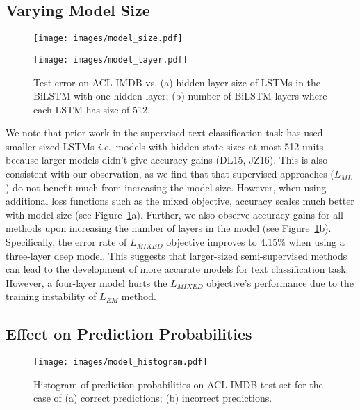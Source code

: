 \documentclass[letterpaper]{article}
\begin{document}
\subsection{Varying Model Size}
\begin{figure}[!htp]
\begin{minipage}{0.5\linewidth}
\centering
\texttt{[image: images/model\_size.pdf]}
\label{fig:hidden_size}
\end{minipage}\begin{minipage}{0.5\linewidth}
\centering
\texttt{[image: images/model\_layer.pdf]}
\label{fig:layers}
\end{minipage}
\caption{Test error on ACL-IMDB vs. (a) hidden layer size of LSTMs in the BiLSTM with one-hidden layer; (b) number of BiLSTM layers where each LSTM has size of 512.}
\label{fig:model_size}
\end{figure}

We note that prior work in the supervised text classification task has used smaller-sized LSTMs \emph{i.e.}\ models with hidden state sizes at most 512 units because larger models didn't give accuracy gains (DL15, JZ16). This is also consistent with our observation, as we find that that supervised approaches ($L_{\textit{ML}}$) do not benefit much from increasing the model size. However, when using additional loss functions such as the mixed objective, accuracy scales much better with model size (see Figure~\ref{fig:model_size}a). Further, we also observe accuracy gains for all methods upon increasing the number of layers in the model (see Figure~\ref{fig:model_size}b). Specifically, the error rate of $L_{\textit{MIXED}}$ objective improves to 4.15\% when using a three-layer deep model. This suggests that larger-sized semi-supervised methods can lead to the development of more accurate models for text classification task. However, a four-layer model hurts the $L_{\textit{MIXED}}$ objective's performance due to the training instability of $L_{\textit{EM}}$ method.

\subsection{Effect on Prediction Probabilities}
\begin{figure}[t]
\begin{minipage}{\linewidth}
\centering
\texttt{[image: images/model\_histogram.pdf]}
\end{minipage}
\caption{Histogram of prediction probabilities on ACL-IMDB test set for the case of (a) correct predictions; (b) incorrect predictions.}
\label{fig:model_histogram}
\end{figure}
\end{document}
